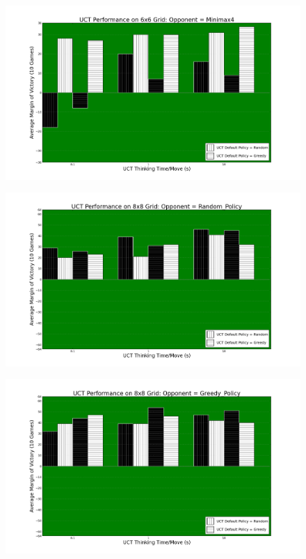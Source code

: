 \documentclass[12pt,letterpaper]{article}
\begin{document}
\begin{figure}[!hp]
\begin{center}
\includegraphics[scale=.4]{66_Minimax4}
\end{center}
\end{figure}

\begin{figure}[!hp]
\begin{center}
\includegraphics[scale=.4]{88_Random_Policy}
\end{center}
\end{figure}

\begin{figure}[!hp]
\begin{center}
\includegraphics[scale=.4]{88_Greedy_Policy}
\end{center}
\end{figure}
\end{document}
